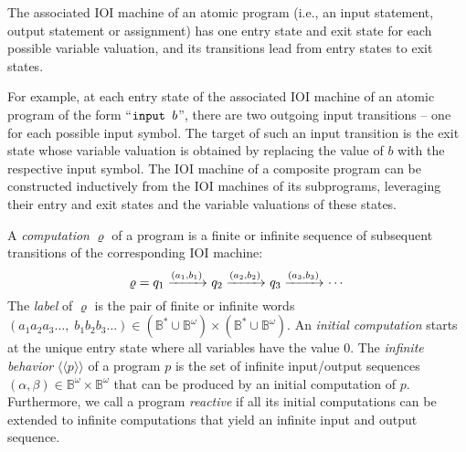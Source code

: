 \documentclass[submission,copyright,creativecommons]{eptcs}
\newcommand{\ignore}[1]{}
\newcommand{\set}[1]{\left\{ #1 \right\}}
\newcommand{\sembrackk}[1]{\langle\langle #1 \rangle\rangle}\newcommand{\lbar}[1]{\overline{#1}}
\newcommand{\pcode}[1]{\textup{\tt{#1}}}\newcommand{\tup}[1]{\overline{#1}}
\newcommand{\sigmain}{\mathbb{B}}
\newcommand{\sigmaout}{\mathbb{B}}
\begin{document}
The associated IOI machine of an atomic program (i.e., an input statement,
output statement or assignment) has one entry state and exit state for
each possible variable valuation,
and its transitions lead from entry states to
exit states.
\ignore{Figure \ref{atomicioi} shows the associated IOI machine for the atomic program
``$\pcode{input } b$'' over $B = \set{b}$.
\begin{figure}[h!]\label{atomicioi}
\centering
\begin{subfigure}[h!]{9cm}
\centering	
\begin{framed}
\begin{tikzpicture}
	\tikzstyle{every state}+=[rounded rectangle]
	\node[state] (p0) at (0,0) {$b=0$};
	\node[state] (p1) at (0,-2) {$b=1$};
	\node[state,rectangle] (q0) at (6,0) {$b=0$};
	\node[state,rectangle] (q1) at (6	,-2) {$b=1$};
	
	\path[->] (p0) edge node {$(0,\varepsilon)$} (q0);
	\path[->] (p0) edge node[sloped,above=3mm,left=4mm] {$(1,\varepsilon)$} (q1);
	\path[->] (p1) edge node[sloped,above=3mm,left=12mm] {$(0,\varepsilon)$} (q0);
	\path[->] (p1) edge node {$(1,\varepsilon)$} (q1);
\end{tikzpicture}
\end{framed}
\end{subfigure}
\caption{The associated IOI machine of ``$\pcode{input } b$'' for $B=\set{b}$.
	Entry states have rounded corners, exit states have non-rounded corners.\ignore{TODO!}}
\end{figure}
}
For example, at each entry state of the associated IOI machine of an atomic
program of the form ``$\pcode{input } b$'', there are two outgoing input transitions
-- one for each possible input symbol.
The target of such an input transition is the exit state whose variable
valuation is obtained by replacing the value of $b$ with the respective
input symbol.\ignore{TODO: Better explanation?}
The IOI machine of a composite program can be constructed
inductively from the IOI machines of its subprograms,
leveraging their entry and exit states and the
variable valuations of these states.

A \emph{computation} $\varrho$ of a program is a finite or
infinite sequence of subsequent transitions of the corresponding IOI machine:
\[
	\varrho = q_1 \xrightarrow{(a_1,b_1)}_{} q_2 \xrightarrow{(a_2,b_2)}_{} q_3 \xrightarrow{(a_3,b_3)}_{} \cdots
\]
The \emph{label} of $\varrho$ is the pair of finite or
infinite words
$(a_1 a_2 a_3 \ldots, \; b_1 b_2 b_3 \ldots) \in
	(\sigmain^* \cup \sigmain^\omega) \times (\sigmaout^* \cup \sigmaout^\omega)$.
An \emph{initial computation} starts at the unique entry
state where all variables have the value $0$.
The \emph{infinite behavior} $\sembrackk{p}$ of a program $p$
is the set of infinite input/output sequences
$(\alpha,\beta) \in \mathbb{B}^\omega \times \mathbb{B}^\omega$
that can be produced by an initial computation of $p$.
Furthermore, we call a program \emph{reactive} if all its initial computations
can be extended to infinite computations that yield an infinite input
and output sequence.
\end{document}
